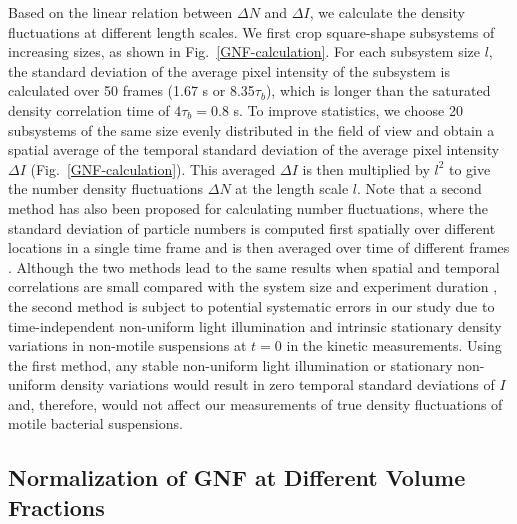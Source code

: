 Based on the linear relation between $\Delta N$ and $\Delta I$, we calculate the density fluctuations at different length scales. We first crop square-shape subsystems of increasing sizes, as shown in Fig.~\ref{GNF-calculation}. For each subsystem size $l$, the standard deviation of the average pixel intensity of the subsystem is calculated over 50 frames (1.67 s or 8.35$\tau_b$), which is longer than the saturated density correlation time of $4\tau_b = 0.8$ s. To improve statistics, we choose 20 subsystems of the same size evenly distributed in the field of view and obtain a spatial average of the temporal standard deviation of the average pixel intensity $\Delta I$ (Fig.~\ref{GNF-calculation}). This averaged $\Delta I$ is then multiplied by $l^2$ to give the number density fluctuations $\Delta N$ at the length scale $l$. Note that a second method has also been proposed for calculating number fluctuations, where the standard deviation of particle numbers is computed first spatially over different locations in a single time frame and is then averaged over time of different frames \cite{Aranson2008}.  Although the two methods lead to the same results when spatial and temporal correlations are small compared with the system size and experiment duration \cite{Aranson2008}, the second method is subject to potential systematic errors in our study due to time-independent non-uniform light illumination and intrinsic stationary density variations in non-motile suspensions at $t=0$ in the kinetic measurements. Using the first method, any stable non-uniform light illumination or stationary non-uniform density variations would result in zero temporal standard deviations of $I$ and, therefore, would not affect our measurements of true density fluctuations of motile bacterial suspensions.


\subsection{Normalization of GNF at Different Volume Fractions}

